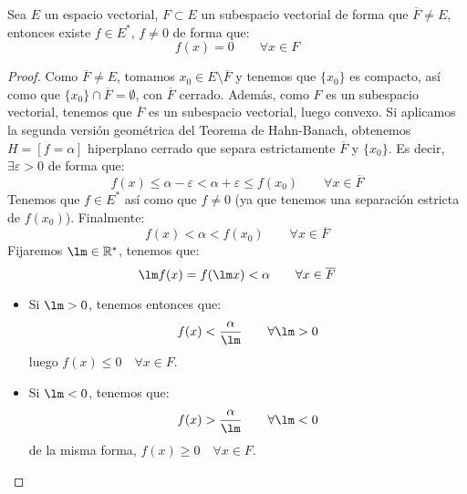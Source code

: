 \begin{coro}
    Sea $E$ un espacio vectorial, $F\subset E$ un subespacio vectorial de forma que $\overline{F}\neq E$, entonces existe $f\in E^\ast$, $f\neq 0$ de forma que:
    \begin{equation*}
        f(x) = 0 \qquad \forall x\in F
    \end{equation*}
    \begin{proof}
        Como $\overline{F}\neq E$, tomamos $x_0\in E\setminus \overline{F}$ y tenemos que $\{x_0\}$ es compacto, así como que $\{x_0\}\cap \overline{F}=\emptyset $, con $\overline{F}$ cerrado. Además, como $F$ es un subespacio vectorial, tenemos que $\overline{F}$ es un subespacio vectorial, luego convexo. Si aplicamos la segunda versión geométrica del Teorema de Hahn-Banach, obtenemos $H=[f=\alpha]$ hiperplano cerrado que separa estrictamente $\overline{F}$ y $\{x_0\}$. Es decir, $\exists \varepsilon>0$ de forma que:
        \begin{equation*}
            f(x) \leq \alpha - \varepsilon < \alpha + \varepsilon \leq f(x_0) \qquad \forall x\in \overline{F}
        \end{equation*}
        Tenemos que $f\in E^\ast$ así como que $f\neq 0$ (ya que tenemos una separación estricta de $f(x_0)$). Finalmente:
        \begin{equation*}
            f(x) < \alpha < f(x_0) \qquad \forall x\in \overline{F}
        \end{equation*}
        Fijaremos $\lm\in \mathbb{R}^\ast$, tenemos que: 
        \begin{equation*}
            \lm f(x) = f(\lm x) < \alpha \qquad \forall x\in \overline{F}
        \end{equation*}
        \begin{itemize}
            \item Si $\lm > 0$, tenemos entonces que:
                \begin{equation*}
                    f(x) < \dfrac{\alpha}{\lm} \qquad \forall \lm > 0
                \end{equation*}
                luego $f(x) \leq 0\quad \forall x\in F$.
            \item Si $\lm < 0$, tenemos que:
                \begin{equation*}
                    f(x) > \dfrac{\alpha}{\lm} \qquad \forall \lm < 0
                \end{equation*}
                de la misma forma, $f(x) \geq 0\quad \forall x\in F$.
        \end{itemize}
    \end{proof}
\end{coro}

